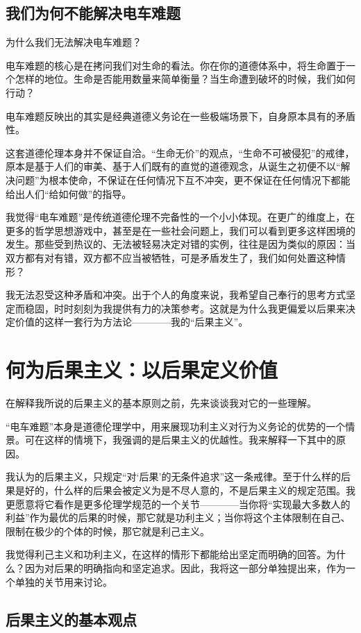 \documentclass[10pt]{article}
\begin{document}
   \subsection{我们为何不能解决电车难题}
   为什么我们无法解决电车难题？\par
    电车难题的核心是在拷问我们对生命的看法。你在你的道德体系中，将生命置于一个怎样的地位。生命是否能用数量来简单衡量？当生命遭到破坏的时候，我们如何行动？ 
    \par
    电车难题反映出的其实是经典道德义务论在一些极端场景下，自身原本具有的矛盾性。\par
    这套道德伦理本身并不保证自洽。“生命无价”的观点，“生命不可被侵犯”的戒律，原本是基于人们的审美、基于人们既有的直觉的道德观念，从诞生之初便不以“解决问题”为根本使命，不保证在任何情况下互不冲突，更不保证在任何情况下都能给出人们“给如何做”的指导。\par
    我觉得“电车难题”是传统道德伦理不完备性的一个小小体现。在更广的维度上，在更多的哲学思想游戏中，甚至是在一些社会问题上，我们可以看到更多这样困境的发生。那些受到热议的、无法被轻易决定对错的实例，往往是因为类似的原因：当双方都有对有错，双方都不应当被牺牲，可是矛盾发生了，我们如何处置这种情形？

    我无法忍受这种矛盾和冲突。出于个人的角度来说，我希望自己奉行的思考方式坚定而稳固，时时刻刻为我提供有力的决策参考。这就是为什么我更偏爱以后果来决定价值的这样一套行为方法论————我的“后果主义”。

\section{何为后果主义：以后果定义价值}
在解释我所说的后果主义的基本原则之前，先来谈谈我对它的一些理解。
    
    “电车难题”本身是道德伦理学中，用来展现功利主义对行为义务论的优势的一个情景。可在这样的情境下，我强调的是后果主义的优越性。我来解释一下其中的原因。
     
    我认为的后果主义，只规定“对‘后果’的无条件追求”这一条戒律。至于什么样的后果是好的，什么样的后果会被定义为是不尽人意的，不是后果主义的规定范围。我更愿意将它看作是更多伦理学规范的一个关节————当你将“实现最大多数人的利益”作为最优的后果的时候，那它就是功利主义；当你将这个主体限制在自己、限制在极少的个体的时候，那它就是利己主义。
          
    我觉得利己主义和功利主义，在这样的情形下都能给出坚定而明确的回答。为什么？因为对后果的明确指向和坚定追求。因此，我将这一部分单独提出来，作为一个单独的关节用来讨论。
    
    \subsection{后果主义的基本观点}
      
\end{document}
